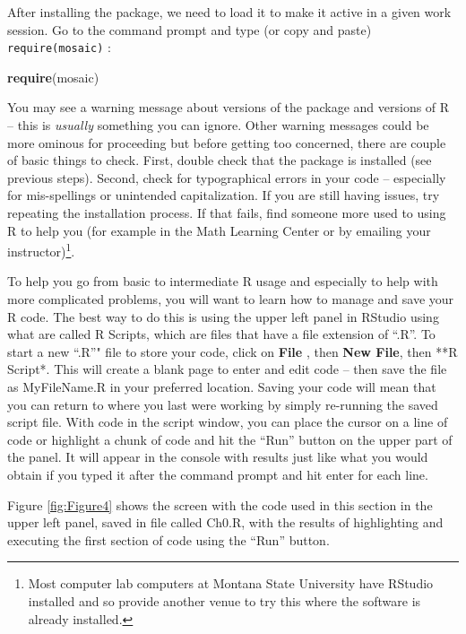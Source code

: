 \documentclass[]{article}
\newenvironment{Shaded}{\begin{snugshade}}{\end{snugshade}}
\newcommand{\KeywordTok}[1]{\textcolor[rgb]{0.13,0.29,0.53}{\textbf{{#1}}}}
\newcommand{\NormalTok}[1]{{#1}}
\let\rmarkdownfootnote\footnote%
\def\footnote{\protect\rmarkdownfootnote}
\begin{document}
After installing the package, we need to load it to make it active in a
given work session. Go to the command prompt and type (or copy and
paste) \texttt{require(mosaic)} :

\begin{Shaded}
\begin{Highlighting}[]
\KeywordTok{require}\NormalTok{(mosaic)}
\end{Highlighting}
\end{Shaded}

You may see a warning message about versions of the package and versions
of R -- this is \emph{usually} something you can ignore. Other warning
messages could be more ominous for proceeding but before getting too
concerned, there are couple of basic things to check. First, double
check that the package is installed (see previous steps). Second, check
for typographical errors in your code -- especially for mis-spellings or
unintended capitalization. If you are still having issues, try repeating
the installation process. If that fails, find someone more used to using
R to help you (for example in the Math Learning Center or by emailing
your instructor)\footnote{Most computer lab computers at Montana State
  University have RStudio installed and so provide another venue to try
  this where the software is already installed.}.

To help you go from basic to intermediate R usage and especially to help
with more complicated problems, you will want to learn how to manage and
save your R code. The best way to do this is using the upper left panel
in RStudio using what are called R Scripts, which are files that have a
file extension of ``.R''. To start a new ``.R''" file to store your
code, click on \textbf{File} , then \textbf{New File}, then **R Script*.
This will create a blank page to enter and edit code -- then save the
file as MyFileName.R in your preferred location. Saving your code will
mean that you can return to where you last were working by simply
re-running the saved script file. With code in the script window, you
can place the cursor on a line of code or highlight a chunk of code and
hit the ``Run'' button on the upper part of the panel. It will appear in
the console with results just like what you would obtain if you typed it
after the command prompt and hit enter for each line.

Figure \ref{fig:Figure4} shows the screen with the code used in this
section in the upper left panel, saved in file called Ch0.R, with the
results of highlighting and executing the first section of code using
the ``Run'' button.
\end{document}
